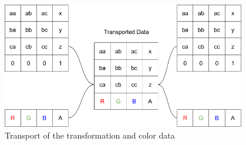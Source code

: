 \begin{figure}[htbp]
	\centering
	\includegraphics[width=0.95\textwidth]{images/solution/Matrix+Color.png}
	\caption{Transport of the transformation and color data}
	\label{fig:color_matrix}
\end{figure}







